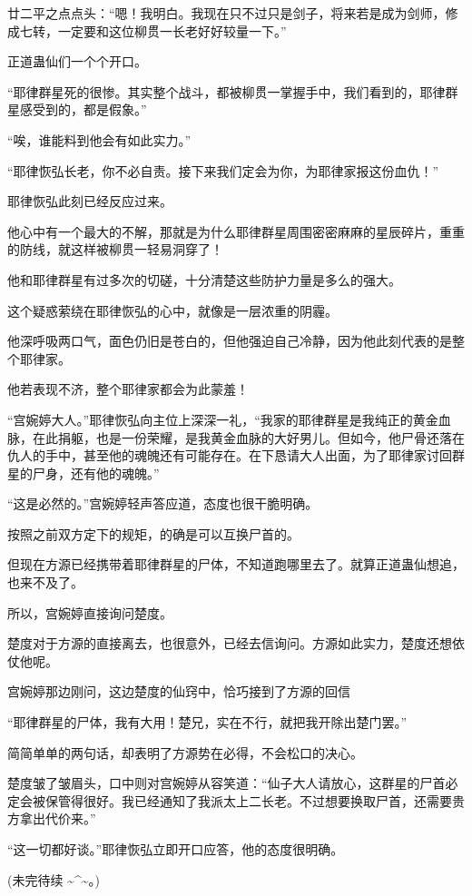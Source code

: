 \begin{this_body}
廿二平之点点头：“嗯！我明白。我现在只不过只是剑子，将来若是成为剑师，修成七转，一定要和这位柳贯一长老好好较量一下。”

正道蛊仙们一个个开口。

“耶律群星死的很惨。其实整个战斗，都被柳贯一掌握手中，我们看到的，耶律群星感受到的，都是假象。”

“唉，谁能料到他会有如此实力。”

“耶律恢弘长老，你不必自责。接下来我们定会为你，为耶律家报这份血仇！”

耶律恢弘此刻已经反应过来。

他心中有一个最大的不解，那就是为什么耶律群星周围密密麻麻的星辰碎片，重重的防线，就这样被柳贯一轻易洞穿了！

他和耶律群星有过多次的切磋，十分清楚这些防护力量是多么的强大。

这个疑惑萦绕在耶律恢弘的心中，就像是一层浓重的阴霾。

他深呼吸两口气，面色仍旧是苍白的，但他强迫自己冷静，因为他此刻代表的是整个耶律家。

他若表现不济，整个耶律家都会为此蒙羞！

“宫婉婷大人。”耶律恢弘向主位上深深一礼，“我家的耶律群星是我纯正的黄金血脉，在此捐躯，也是一份荣耀，是我黄金血脉的大好男儿。但如今，他尸骨还落在仇人的手中，甚至他的魂魄还有可能存在。在下恳请大人出面，为了耶律家讨回群星的尸身，还有他的魂魄。”

“这是必然的。”宫婉婷轻声答应道，态度也很干脆明确。

按照之前双方定下的规矩，的确是可以互换尸首的。

但现在方源已经携带着耶律群星的尸体，不知道跑哪里去了。就算正道蛊仙想追，也来不及了。

所以，宫婉婷直接询问楚度。

楚度对于方源的直接离去，也很意外，已经去信询问。方源如此实力，楚度还想依仗他呢。

宫婉婷那边刚问，这边楚度的仙窍中，恰巧接到了方源的回信

“耶律群星的尸体，我有大用！楚兄，实在不行，就把我开除出楚门罢。”

简简单单的两句话，却表明了方源势在必得，不会松口的决心。

楚度皱了皱眉头，口中则对宫婉婷从容笑道：“仙子大人请放心，这群星的尸首必定会被保管得很好。我已经通知了我派太上二长老。不过想要换取尸首，还需要贵方拿出代价来。”

“这一切都好谈。”耶律恢弘立即开口应答，他的态度很明确。

(未完待续 \~{}\^{}\~{}。)

\end{this_body}

